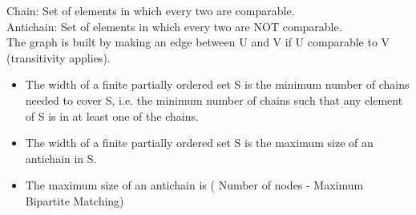 Chain: Set of elements in which every two are comparable.\\
Antichain: Set of elements in which every two are NOT comparable.\\
The graph is built by making an edge between U and V if U comparable to V (transitivity applies).
\begin{itemize}
  \item The width of a finite partially ordered set S is the minimum number of chains needed to cover S, i.e. the minimum number of chains such that any element of S is in at least one of the chains.
  \item The width of a finite partially ordered set S is the maximum size of an antichain in S.
  \item The maximum size of an antichain is ( Number of nodes - Maximum Bipartite Matching)
\end{itemize}
